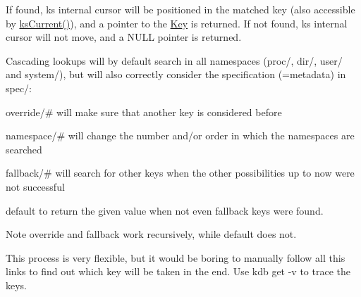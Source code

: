 If found, {\ttfamily ks} internal cursor will be positioned in the matched key (also accessible by \mbox{\hyperlink{group__keyset_ga4287b9416912c5f2ab9c195cb74fb094}{ks\+Current()}}), and a pointer to the \mbox{\hyperlink{classkdb_1_1Key}{Key}} is returned. If not found, {\ttfamily ks} internal cursor will not move, and a N\+U\+LL pointer is returned.

Cascading lookups will by default search in all namespaces (proc/, dir/, user/ and system/), but will also correctly consider the specification (=metadata) in spec/\+:


\begin{DoxyItemize}
\item {\ttfamily override/\#} will make sure that another key is considered before
\item {\ttfamily namespace/\#} will change the number and/or order in which the namespaces are searched
\item {\ttfamily fallback/\#} will search for other keys when the other possibilities up to now were not successful
\item {\ttfamily default} to return the given value when not even {\ttfamily fallback} keys were found.
\end{DoxyItemize}

\begin{DoxyNote}{Note}
override and fallback work recursively, while default does not.
\end{DoxyNote}
This process is very flexible, but it would be boring to manually follow all this links to find out which key will be taken in the end. Use {\ttfamily kdb get -\/v} to trace the keys.

